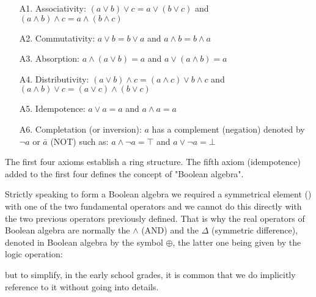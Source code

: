 	\begin{itemize}
		\item[A1.] Associativity: $(a \vee b)\vee c=a \vee (b \vee c)$ and $(a \wedge b)\wedge c=a \wedge (b\wedge c)$
		
		\item[A2.] Commutativity: $a \vee b=b \vee a$ and $a \wedge b=b\wedge a$
		
		\item[A3.] Absorption: $a \wedge (a \vee b)=a$ and $a \vee (a \wedge b)=a$
		
		\item[A4.] Distributivity: $(a \vee b)\wedge c=(a \wedge c)\vee b \wedge c$ and $(a\wedge b)\vee c=(a \vee c)\wedge(b\vee c)$
		
		\item[A5.] Idempotence: $a \vee a=a$ and $a\wedge a=a$
		
		\item[A6.] Completation (or inversion): $a$ has a complement (negation) denoted by $\neg a$ or $\bar{a}$ (NOT) such as: $a \wedge \neg a=\top$ and $a \vee \neg a=\bot$
	\end{itemize}
	\begin{tcolorbox}[title=Remark,colframe=black,arc=10pt]
	The first four axioms establish a ring structure. The fifth axiom (idempotence) added to the first four defines the concept of "Boolean algebra".
	\end{tcolorbox}
	Strictly speaking to form a Boolean algebra we required a symmetrical element () with one of the two fundamental operators and we cannot do this directly with the two previous operators previously defined. That is why the real operators of Boolean algebra are normally the $\wedge$ (AND) and the $\Delta$ (symmetric difference), denoted in Boolean algebra by the symbol $\oplus$, the latter one being given by the logic operation:
	
	but to simplify, in the early school grades, it is common that we do implicitly reference to it without going into details.
	
